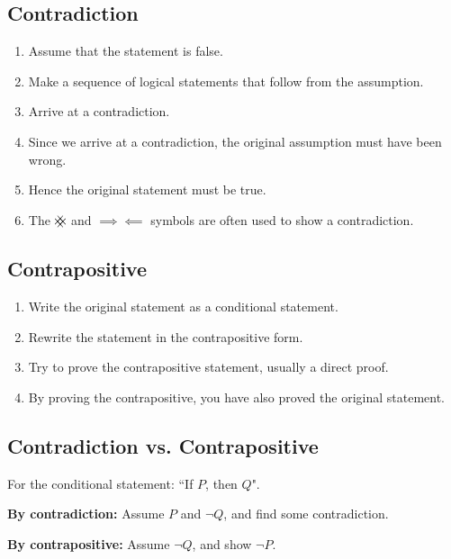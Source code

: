 \documentclass{article}
\newcommand{\contradiction}{
    \hspace{-1em}
	{\hbox{
	\setbox0=\hbox{$\mkern-3mu{\times}\mkern-3mu$}
	\setbox1=\hbox to0pt{\hss\copy0\hss}
	\copy0\raisebox{0.5\wd0}{\copy1}\raisebox{-0.5\wd0}{\box1}\box0}}
}
\theoremstyle{plain}
\numberwithin{theorem}{subsection}
\theoremstyle{definition}
\numberwithin{definition}{subsection}
\theoremstyle{remark}
\numberwithin{note}{subsection}
\begin{document}
\subsection{Contradiction}
\begin{enumerate}
    \item Assume that the statement is false.
    \item Make a sequence of logical statements that follow from the assumption.
    \item Arrive at a contradiction.
    \item Since we arrive at a contradiction, the original assumption must have been wrong.
    \item Hence the original statement must be true.
    \item The $\contradiction$ and $\implies\!\!\!\!\impliedby$ symbols
          are often used to show a contradiction.
\end{enumerate}
%
\subsection{Contrapositive}
\begin{enumerate}
    \item Write the original statement as a conditional statement.
    \item Rewrite the statement in the contrapositive form.
    \item Try to prove the contrapositive statement, usually a direct proof.
    \item By proving the contrapositive, you have also proved the original statement.
\end{enumerate}
%
\subsection{Contradiction vs. Contrapositive}
For the conditional statement: ``If $P$, then $Q$".

\textbf{By contradiction:} Assume $P$ and $\neg{Q}$, and find some contradiction.

\textbf{By contrapositive:} Assume $\neg{Q}$, and show $\neg{P}$.
%
\end{document}
